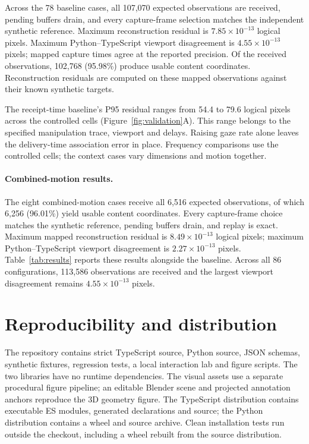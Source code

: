 \documentclass[sigconf,screen,nonacm]{acmart}
\begin{document}
Across the 78 baseline cases, all 107,070 expected observations are received, pending
buffers drain, and every capture-frame selection matches the independent
synthetic reference. Maximum reconstruction residual is
$7.85\times10^{-13}$ logical pixels. Maximum Python--TypeScript viewport
disagreement is $4.55\times10^{-13}$ pixels; mapped capture times agree at the
reported precision. Of the received observations, 102,768 (95.98\%) produce
usable content coordinates. Reconstruction residuals are computed on these
mapped observations against their known synthetic targets.

The receipt-time baseline's P95 residual ranges from 54.4 to 79.6 logical pixels
across the controlled cells (Figure~\ref{fig:validation}A). This range belongs to
the specified manipulation trace, viewport and delays. Raising gaze rate alone
leaves the delivery-time association error in place. Frequency comparisons use
the controlled cells; the context cases vary dimensions and motion together.

\paragraph{Combined-motion results.}
The eight combined-motion cases receive all 6,516 expected observations, of
which 6,256 (96.01\%) yield usable content coordinates. Every capture-frame
choice matches the synthetic reference, pending buffers drain, and replay is
exact. Maximum mapped reconstruction residual is $8.49\times10^{-13}$ logical
pixels; maximum Python--TypeScript viewport disagreement is
$2.27\times10^{-13}$ pixels. Table~\ref{tab:results} reports these results
alongside the baseline. Across all 86 configurations, 113,586 observations are
received and the largest viewport disagreement remains
$4.55\times10^{-13}$ pixels.

\begin{table}[t]
\caption{Numerical consistency for the 78-case rate/context baseline and eight combined-motion cases. Spatial residuals use logical viewport pixels or content units, as indicated.}
\label{tab:results}\small

\end{table}

\section{Reproducibility and distribution}
The repository contains strict TypeScript source, Python source, JSON schemas,
synthetic fixtures, regression tests, a local interaction lab and figure scripts.
The two libraries have no runtime dependencies. The visual assets use a separate
procedural figure pipeline; an editable Blender scene and projected annotation
anchors reproduce the 3D geometry figure. The TypeScript distribution contains
executable ES modules, generated declarations and source; the Python distribution
contains a wheel and source archive. Clean installation tests run outside the
checkout, including a wheel rebuilt from the source distribution.
\end{document}
